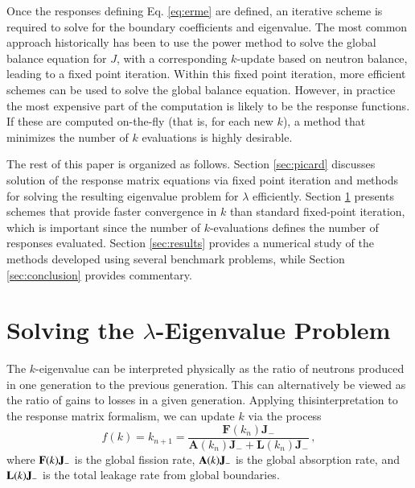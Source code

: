 Once the responses defining Eq. \ref{eq:erme}  are defined, an 
iterative scheme is 
required to solve for the boundary coefficients and eigenvalue.  The most
common approach historically has been to use the power method to solve the 
global balance equation for $J$, with a corresponding $k$-update 
based on neutron balance, leading to a fixed point iteration.  
Within this fixed point iteration, more efficient schemes can be 
used to solve the global balance equation.  
However, in practice the most expensive part of the computation is likely 
to be the response functions.  If these are computed on-the-fly (that is, 
for each new $k$), a method that minimizes the number of $k$ evaluations is
highly desirable.

The rest of this paper is organized as follows.  Section \ref{sec:picard}
discusses solution of the response matrix equations via fixed point 
iteration and methods for solving the resulting eigenvalue problem 
for $\lambda$ efficiently.  Section \ref{sec:newton} presents schemes 
that provide faster convergence in $k$ than standard fixed-point iteration,
which is important since the number of $k$-evaluations defines the 
number of responses evaluated.  Section \ref{sec:results} provides 
a numerical study of the methods developed using 
several benchmark problems, while Section \ref{sec:conclusion}
provides commentary.


\section{Solving the $\lambda$-Eigenvalue Problem}
\label{sec:newton}

The $k$-eigenvalue can be interpreted physically as the ratio of neutrons
produced in one generation to the previous generation.  This can 
alternatively be viewed as the ratio of gains to losses in a given 
generation. Applying thisinterpretation to the response matrix formalism, 
we can update $k$ via the process
\begin{equation}
 f(k) = k_{n+1} = \frac{\mathbf{F}(k_{n})\mathbf{J}_{-}} 
    { \mathbf{A}(k_{n}) \mathbf{J}_{-} + \mathbf{L}(k_{n}) \mathbf{J}_{-} }\, ,
\label{eq:picard}
\end{equation}
where $\mathbf{F}(k)\mathbf{J}_{-}$ is the global fission rate, 
$\mathbf{A}(k) \mathbf{J}_{-}$ is the global absorption rate,
and $\mathbf{L}(k) \mathbf{J}_{-}$ is the total leakage rate
from global boundaries.

